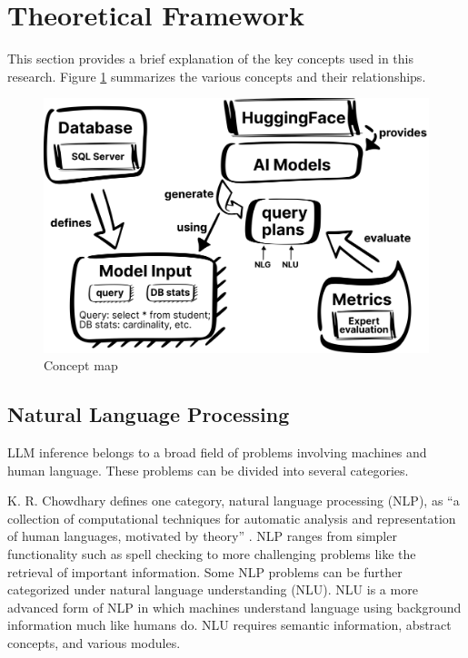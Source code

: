 \section{Theoretical Framework}\label{sec:theoryFrames}
This section provides a brief explanation of the key concepts used in this research. Figure \ref{fig:conceptMap} summarizes the various concepts and their relationships.

\begin{figure}[ht]
  \centering
  \includegraphics[width=\textwidth]{figures/llamaInferenceConceptMap.png}
  \caption{Concept map}
  \label{fig:conceptMap}
\end{figure}


\subsection{Natural Language Processing}
LLM inference belongs to a broad field of problems involving machines and human language. These problems can be divided into several categories.

K. R. Chowdhary defines one category, natural language processing (NLP), as ``a collection of computational techniques for automatic analysis and representation of human languages, motivated by theory'' \cite{chowdhary2020}. NLP ranges from simpler functionality such as spell checking to more challenging problems like the retrieval of important information. Some NLP problems can be further categorized under natural language understanding (NLU). NLU is a more advanced form of NLP in which machines understand language using background information much like humans do. NLU requires semantic information, abstract concepts, and various modules.

